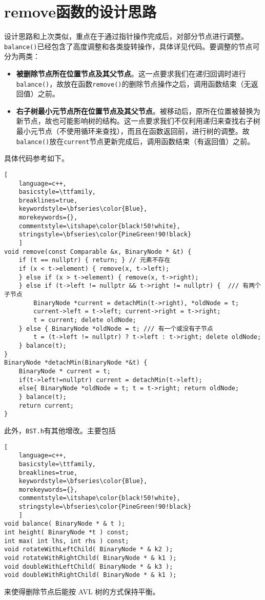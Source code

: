 \documentclass[UTF8]{ctexart}
\begin{document}
\pagestyle{fancy}
\fancyhead{}

\section{remove函数的设计思路}
设计思路和上次类似，重点在于通过指针操作完成后，对部分节点进行调整。\texttt{balance()}已经包含了高度调整和各类旋转操作，具体详见代码。要调整的节点可分为两类：
\begin{itemize}
    \item \textbf{被删除节点所在位置节点及其父节点}。这一点要求我们在递归回调时进行\texttt{balance()}，故放在函数\texttt{remove()}的删除节点操作之后，调用函数结束（无返回值）之前。
    \item \textbf{右子树最小元节点所在位置节点及其父节点}。被移动后，原所在位置被替换为新节点，故也可能影响树的结构。这一点要求我们不仅利用递归来查找右子树最小元节点（不使用循环来查找），而且在函数返回前，进行树的调整。故\texttt{balance()}放在\texttt{current}节点更新完成后，调用函数结束（有返回值）之前。
\end{itemize}

具体代码参考如下。
\begin{lstlisting}[ 
    language=c++,
    basicstyle=\ttfamily,
    breaklines=true,
    keywordstyle=\bfseries\color{Blue}, 
    morekeywords={}, 
    commentstyle=\itshape\color{black!50!white},
    stringstyle=\bfseries\color{PineGreen!90!black} 
    ]
void remove(const Comparable &x, BinaryNode * &t) {
    if (t == nullptr) { return; } // 元素不存在
    if (x < t->element) { remove(x, t->left);
    } else if (x > t->element) { remove(x, t->right);
    } else if (t->left != nullptr && t->right != nullptr) {  /// 有两个子节点
        BinaryNode *current = detachMin(t->right), *oldNode = t;
        current->left = t->left; current->right = t->right;
        t = current; delete oldNode;
    } else { BinaryNode *oldNode = t; /// 有一个或没有子节点
        t = (t->left != nullptr) ? t->left : t->right; delete oldNode; 
    } balance(t);
}
BinaryNode *detachMin(BinaryNode *&t) {
    BinaryNode * current = t;
    if(t->left!=nullptr) current = detachMin(t->left);
    else{ BinaryNode *oldNode = t; t = t->right; return oldNode;
    } balance(t);
    return current;
}
\end{lstlisting}

此外，\texttt{BST.h}有其他增改。主要包括

\begin{lstlisting}[ 
    language=c++,
    basicstyle=\ttfamily,
    breaklines=true,
    keywordstyle=\bfseries\color{Blue}, 
    morekeywords={}, 
    commentstyle=\itshape\color{black!50!white},
    stringstyle=\bfseries\color{PineGreen!90!black} 
    ]
void balance( BinaryNode * & t );
int height( BinaryNode *t ) const;
int max( int lhs, int rhs ) const;
void rotateWithLeftChild( BinaryNode * & k2 );
void rotateWithRightChild( BinaryNode * & k1 );
void doubleWithLeftChild( BinaryNode * & k3 );
void doubleWithRightChild( BinaryNode * & k1 );
\end{lstlisting}
来使得删除节点后能按 AVL 树的方式保持平衡。
\end{document}
